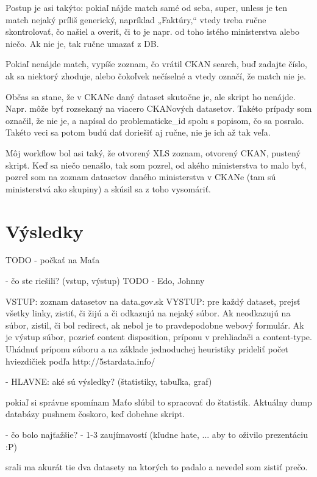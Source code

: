 \documentclass[12pt,a4paper]{article}
\begin{document}
Postup je asi takýto: pokiaľ nájde match samé od seba, super, unless je ten match nejaký príliš generický, napríklad „Faktúry,“ vtedy treba ručne skontrolovať, čo našiel a overiť, či to je napr. od toho istého ministerstva alebo niečo. Ak nie je, tak ručne umazať z DB.

Pokiaľ nenájde match, vypíše zoznam, čo vrátil CKAN search, buď zadajte číslo, ak sa niektorý zhoduje, alebo čokoľvek nečíselné a vtedy označí, že match nie je.

Občas sa stane, že v CKANe daný dataset skutočne je, ale skript ho nenájde. Napr. môže byť rozsekaný na viacero CKANových datasetov. Takéto prípady som označil, že nie je, a napísal do problematicke\_id spolu s popisom, čo sa posralo. Takéto veci sa potom budú dať doriešiť aj ručne, nie je ich až tak veľa.

Môj workflow bol asi taký, že otvorený XLS zoznam, otvorený CKAN, pustený skript. Keď sa niečo nenašlo, tak som pozrel, od akého ministerstva to malo byť, pozrel som na zoznam datasetov daného ministerstva v CKANe (tam sú ministerstvá ako skupiny) a skúsil sa z toho vysomáriť.


\section{Výsledky}

TODO - počkať na Maťa 



  - čo ste riešili? (vstup, výstup)
TODO - Edo, Johnny 

VSTUP: zoznam datasetov na data.gov.sk
VYSTUP: pre každý dataset, prejsť všetky linky, zistiť, či žijú a či odkazujú na nejaký súbor.
      Ak neodkazujú na súbor, zistil, či bol redirect, ak nebol je to pravdepodobne webový formulár. 
      Ak je výstup súbor, pozrieť content disposition, príponu v prehliadači a content-type. Uhádnuť príponu súboru a na základe 
       jednoduchej heuristiky prideliť počet hviezdičiek podľa http://5stardata.info/

  - HLAVNE: aké sú výsledky? (štatistiky, tabuľka, graf) 

pokiaľ si správne spomínam Maťo slúbil to spracovať do štatistík. 
Aktuálny dump databázy pushnem čoskoro, keď dobehne skript.


  - čo bolo najťažšie? 
  - 1-3 zaujímavostí (kľudne hate, ... aby to oživilo prezentáciu :P)

srali ma akurát tie dva datasety na ktorých to padalo a nevedel som zistiť prečo.
\end{document}
